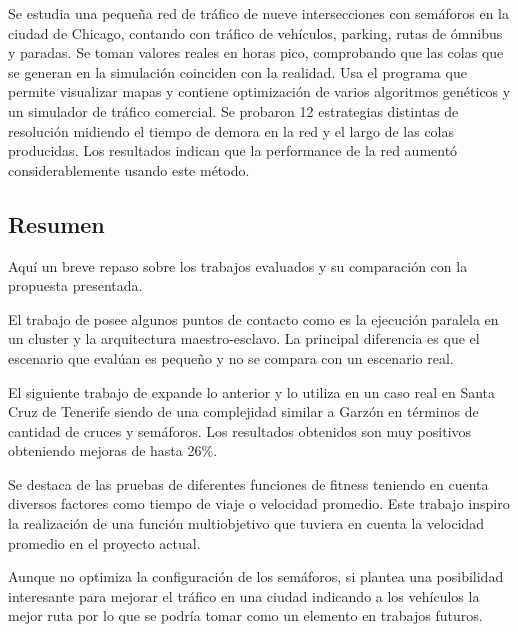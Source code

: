 \begin{itemize}
\begin{item}
	\end{item}	
	
	\begin{item}
		
		Se estudia una pequeña red de tráfico de nueve intersecciones con semáforos en la ciudad de Chicago, contando con tráfico de vehículos, parking, rutas de ómnibus y paradas.  
		Se toman valores reales en horas pico, comprobando que las colas que se generan en la simulación coinciden con la realidad.
		Usa el programa \citep{TRANSYT-7F} que permite visualizar mapas y contiene optimización de varios algoritmos genéticos y \citep{CORSIM}  un simulador de tráfico comercial.
		Se probaron 12 estrategias distintas de resolución midiendo el tiempo de demora en la red y el largo de las colas producidas. Los resultados indican que la performance de la red aumentó considerablemente usando este método.	
	\end{item}	
	
\end{itemize}


\subsection{Resumen}
Aquí un breve repaso sobre los trabajos evaluados y su comparación con la propuesta presentada.

El trabajo de \citet{Sanchez2004} posee algunos puntos de contacto como es la ejecución paralela en un cluster y la arquitectura maestro-esclavo. La principal diferencia es que el escenario que evalúan es pequeño y no se compara con un escenario real.

El siguiente trabajo de \citet{Sanchez2008} expande lo anterior y lo utiliza en un caso real en Santa Cruz de Tenerife siendo de una complejidad similar a Garzón en términos de cantidad de cruces y semáforos. Los resultados obtenidos son muy positivos obteniendo mejoras de hasta 26\%.

Se destaca de \citet{Sanchez2010} las pruebas de diferentes funciones de fitness teniendo en cuenta diversos factores como tiempo de viaje o velocidad promedio. Este trabajo inspiro la realización de una función multiobjetivo que tuviera en cuenta la velocidad promedio en el proyecto actual.

Aunque \citet{Stolfi2012} no optimiza la configuración de los semáforos, si plantea una posibilidad interesante para mejorar el tráfico en una ciudad indicando a los vehículos la mejor ruta por lo que se podría tomar como un elemento en trabajos futuros.

